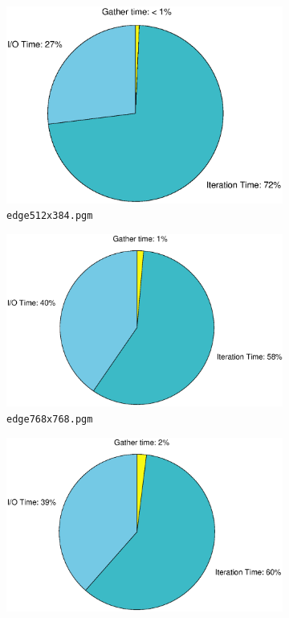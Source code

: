 \documentclass{article} %
\begin{document}
\begin{figure}
\begin{subfigure}[b]{.4\textwidth}
    \label{fig:shares2}
\end{subfigure}
\begin{subfigure}[b]{.4\textwidth}
    \centering
    \includegraphics[width=\textwidth]{figures/shares198_4}
    \caption{\texttt{edge512x384.pgm}}
    \label{fig:shares4}
\end{subfigure}
\hfill
\begin{subfigure}[b]{.4\textwidth}
    \centering
    \includegraphics[width=\textwidth]{figures/shares198_8}
    \caption{\texttt{edge768x768.pgm}}
    \label{fig:shares8}
\end{subfigure}
\begin{subfigure}[b]{.4\textwidth}
    \centering
    \includegraphics[width=\textwidth]{figures/shares198_16}

\end{subfigure}
\end{figure}
\end{document}
